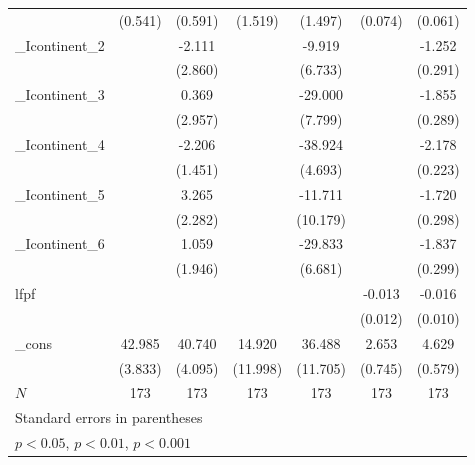 {\begin{tabular}{l*{6}{c}}
            &     (0.541)         &     (0.591)         &     (1.519)         &     (1.497)         &     (0.074)         &     (0.061)         \\
[1em]
\_Icontinent\_2&                     &      -2.111         &                     &      -9.919         &                     &      -1.252\sym{***}\\
            &                     &     (2.860)         &                     &     (6.733)         &                     &     (0.291)         \\
[1em]
\_Icontinent\_3&                     &       0.369         &                     &     -29.000\sym{***}&                     &      -1.855\sym{***}\\
            &                     &     (2.957)         &                     &     (7.799)         &                     &     (0.289)         \\
[1em]
\_Icontinent\_4&                     &      -2.206         &                     &     -38.924\sym{***}&                     &      -2.178\sym{***}\\
            &                     &     (1.451)         &                     &     (4.693)         &                     &     (0.223)         \\
[1em]
\_Icontinent\_5&                     &       3.265         &                     &     -11.711         &                     &      -1.720\sym{***}\\
            &                     &     (2.282)         &                     &    (10.179)         &                     &     (0.298)         \\
[1em]
\_Icontinent\_6&                     &       1.059         &                     &     -29.833\sym{***}&                     &      -1.837\sym{***}\\
            &                     &     (1.946)         &                     &     (6.681)         &                     &     (0.299)         \\
[1em]
lfpf        &                     &                     &                     &                     &      -0.013         &      -0.016         \\
            &                     &                     &                     &                     &     (0.012)         &     (0.010)         \\
[1em]
\_cons      &      42.985\sym{***}&      40.740\sym{***}&      14.920         &      36.488\sym{**} &       2.653\sym{***}&       4.629\sym{***}\\
            &     (3.833)         &     (4.095)         &    (11.998)         &    (11.705)         &     (0.745)         &     (0.579)         \\
\hline
\(N\)       &         173         &         173         &         173         &         173         &         173         &         173         \\
\hline\hline
\multicolumn{7}{l}{\footnotesize Standard errors in parentheses}\\
\multicolumn{7}{l}{\footnotesize \sym{*} \(p<0.05\), \sym{**} \(p<0.01\), \sym{***} \(p<0.001\)}\\
\end{tabular}
}
